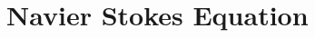 \documentclass[a4paper,10pt]{article}
\begin{document}
\section{Navier Stokes Equation}
\end{document}
